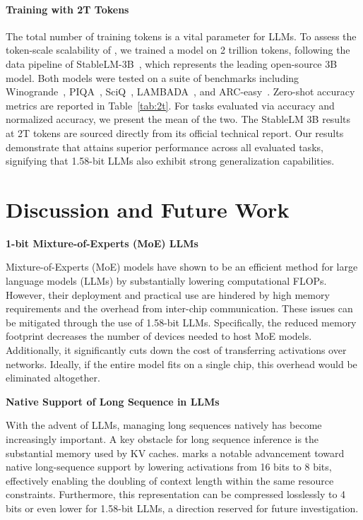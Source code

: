 \paragraph{Training with 2T Tokens}

The total number of training tokens is a vital parameter for LLMs. To assess the token-scale scalability of , we trained a  model on 2 trillion tokens, following the data pipeline of StableLM-3B~\cite{StableLM-3B-4E1T}, which represents the leading open-source 3B model. Both models were tested on a suite of benchmarks including Winogrande~\cite{winoGrande}, PIQA~\cite{piqa}, SciQ~\cite{sciq}, LAMBADA~\cite{lambada}, and ARC-easy~\cite{arc}. Zero-shot accuracy metrics are reported in Table~\ref{tab:2t}. For tasks evaluated via accuracy and normalized accuracy, we present the mean of the two. The StableLM 3B results at 2T tokens are sourced directly from its official technical report. Our results demonstrate that  attains superior performance across all evaluated tasks, signifying that 1.58-bit LLMs also exhibit strong generalization capabilities.

\section{Discussion and Future Work}

\textbf{1-bit Mixture-of-Experts (MoE) LLMs}

Mixture-of-Experts (MoE) models have shown to be an efficient method for large language models (LLMs) by substantially lowering computational FLOPs. However, their deployment and practical use are hindered by high memory requirements and the overhead from inter-chip communication. These issues can be mitigated through the use of 1.58-bit LLMs. Specifically, the reduced memory footprint decreases the number of devices needed to host MoE models. Additionally, it significantly cuts down the cost of transferring activations over networks. Ideally, if the entire model fits on a single chip, this overhead would be eliminated altogether.

\textbf{Native Support of Long Sequence in LLMs}

With the advent of LLMs, managing long sequences natively has become increasingly important. A key obstacle for long sequence inference is the substantial memory used by KV caches.  marks a notable advancement toward native long-sequence support by lowering activations from 16 bits to 8 bits, effectively enabling the doubling of context length within the same resource constraints. Furthermore, this representation can be compressed losslessly to 4 bits or even lower for 1.58-bit LLMs, a direction reserved for future investigation.

